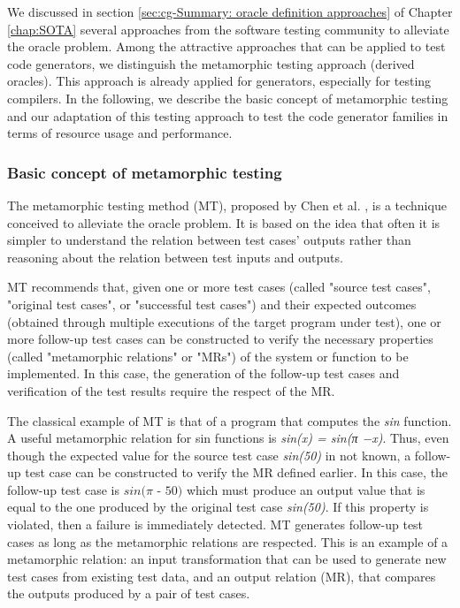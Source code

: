 We discussed in section \ref{sec:cg-Summary: oracle definition approaches} of Chapter \ref{chap:SOTA} several approaches from the software testing community to alleviate the oracle problem. Among the attractive approaches that can be applied to test code generators, we distinguish the metamorphic testing approach (derived oracles). This approach is already applied for generators, especially for testing compilers\cite{donaldson2016metamorphic,tao2010automatic,le2014compiler}. In the following, we describe the basic concept of metamorphic testing and our adaptation of this testing approach to test the code generator families in terms of resource usage and performance.

\subsubsection{Basic concept of metamorphic testing}
The metamorphic testing method (MT), proposed by Chen et al. \cite{chen1998metamorphic}, is a technique conceived to alleviate the oracle problem. It is based on the idea that often it is simpler to understand the relation between test cases' outputs rather than reasoning about the relation between test inputs and outputs. 

MT recommends that, given one or more test cases (called "source test cases", "original test cases", or "successful test cases") and their expected outcomes (obtained through multiple executions of the target program under test), one or more follow-up test cases can be constructed to verify the necessary properties (called "metamorphic relations" or "MRs") of the system or function to be implemented. In this case, the generation of the follow-up test cases and verification of the test results require the respect of the MR.

The classical example of MT is that of a program that computes the \textit{sin} function. A useful metamorphic relation for sin functions is \textit{sin(x) = sin(π −x)}. Thus, even though the expected value for the source test case \textit{sin(50)} in not known, a follow-up test case can be constructed to verify the MR defined earlier. In this case, the follow-up test case is $\textit{sin($\pi$ - 50)}$ which must produce an output value that is equal to the one produced by the original test case \textit{sin(50)}. If this property is violated, then a failure is immediately detected.
MT generates follow-up test cases as long as the metamorphic relations are respected.
This is an example of a metamorphic relation: an input transformation that can be used to generate new test cases from existing test data, and an output relation (MR), that compares the outputs produced by a pair of test cases.

